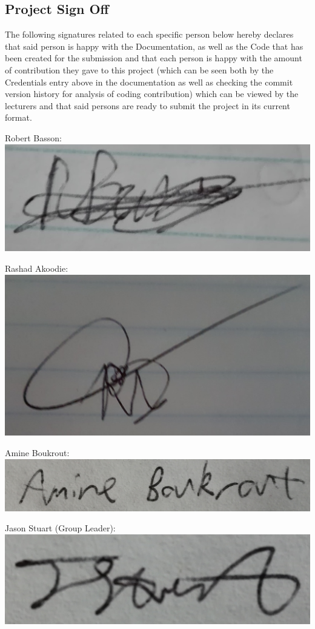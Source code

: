 \documentclass[a4paper,12pt]{article}
\begin{document}
\begin{itemize}
\section{Project Sign Off}
The following signatures related to each specific person below hereby declares that said person is happy with the Documentation, as well as the Code that has been created for the submission and that each person is happy with the amount of contribution they gave to this project (which can be seen both by the Credentials entry above in the documentation as well as checking the commit version history for analysis of coding contribution) which can be viewed by the lecturers and that said persons are ready to submit the project in its current format.

Robert Basson: \includegraphics[scale=0.12]{Robert_Signature}

Rashad Akoodie: \includegraphics[scale=0.08]{Rashad_Signature}

Amine Boukrout: \includegraphics[scale=0.05]{Amine_Signature}

Jason Stuart (Group Leader): \includegraphics[scale=0.05]{Jason_Signature}

\end{itemize}
\end{document}
